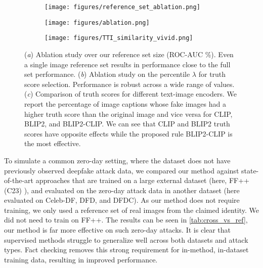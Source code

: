 \documentclass{article} \usepackage{iclr2024_conference,times}
\begin{document}
\begin{figure}
     \centering
      \begin{subfigure}[b]{0.29\textwidth}
     \centering
     \texttt{[image: figures/reference\_set\_ablation.png]}
     \vspace{-1.5em}
     \caption{}
     \label{fig:reference_set_ablation}
     \end{subfigure}
     \hfill
\begin{subfigure}[b]{0.325\textwidth}
         \centering
         \texttt{[image: figures/ablation.png]}
         \vspace{-1.5em}
         \caption{}
         \label{fig:av_ablation}
     \end{subfigure}
     \hfill
\begin{subfigure}[b]{0.36\textwidth}
         \centering
         \texttt{[image: figures/TTI\_similarity\_vivid.png]}
         \vspace{-1.5em}
         \caption{}
         \label{fig:tti}
     \end{subfigure}
\caption{(\textit{a}) Ablation study over our reference set size (ROC-AUC \%). Even a single image reference set results in performance close to the full set performance. (\textit{b}) Ablation study on the percentile $\lambda$ for truth score selection. Performance is robust across a wide range of values. (\textit{c}) Comparison of truth scores for different text-image encoders. We report the percentage of image captions whose fake images had a higher truth score than the original image and vice versa for CLIP, BLIP2, and BLIP2-CLIP. We can see that CLIP and BLIP2 truth scores have opposite effects while the proposed rule BLIP2-CLIP is the most effective.}
        \vspace{-0.5em}
\end{figure}


To simulate a common zero-day setting, where the dataset does not have previously observed deepfake attack data, we compared our method against state-of-the-art approaches that are trained on a large external dataset (here, FF++(C23) \citep{learning3_ff++}), and evaluated on the zero-day attack data in another dataset (here evaluated on Celeb-DF, DFD, and DFDC). As our method does not require training, we only used a reference set of real images from the claimed identity. We did not need to train on FF++. The results can be seen in \cref{tab:cross_vs_ref}, our method is far more effective on such zero-day attacks. It is clear that supervised methods struggle to generalize well across both datasets and attack types. Fact checking removes this strong requirement for in-method, in-dataset training data, resulting in improved performance.    
\end{document}

